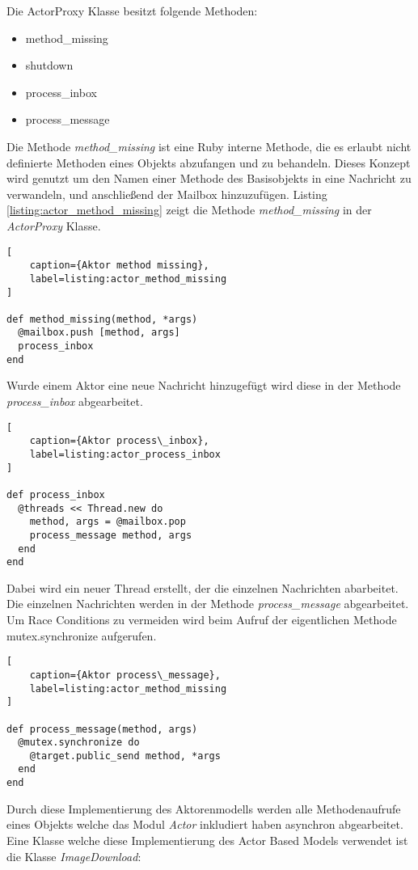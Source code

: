 Die ActorProxy Klasse besitzt folgende Methoden:

\begin{itemize}
  \item method\_missing
  \item shutdown
  \item process\_inbox
  \item process\_message
\end{itemize}

Die Methode \emph{method\_missing} ist eine Ruby interne Methode, die es erlaubt nicht definierte Methoden eines Objekts abzufangen und zu behandeln. Dieses Konzept wird genutzt um den Namen einer Methode des Basisobjekts in eine Nachricht zu verwandeln, und anschließend der Mailbox hinzuzufügen. Listing \ref{listing:actor_method_missing} zeigt die Methode \emph{method\_missing} in der \emph{ActorProxy} Klasse. 

\begin{lstlisting}[
	caption={Aktor method missing},
	label=listing:actor_method_missing
]

def method_missing(method, *args)
  @mailbox.push [method, args]
  process_inbox
end
\end{lstlisting}

Wurde einem Aktor eine neue Nachricht hinzugefügt wird diese in der Methode \emph{process\_inbox} abgearbeitet. 

\begin{lstlisting}[
	caption={Aktor process\_inbox},
	label=listing:actor_process_inbox
]

def process_inbox
  @threads << Thread.new do
    method, args = @mailbox.pop
    process_message method, args
  end
end
\end{lstlisting}	

Dabei wird ein neuer Thread erstellt, der die einzelnen Nachrichten abarbeitet. Die einzelnen Nachrichten werden in der Methode \emph{process\_message} abgearbeitet. Um Race Conditions zu vermeiden wird beim Aufruf der eigentlichen Methode mutex.synchronize aufgerufen. 


\begin{lstlisting}[
	caption={Aktor process\_message},
	label=listing:actor_method_missing
]

def process_message(method, args)
  @mutex.synchronize do
    @target.public_send method, *args
  end
end
\end{lstlisting}	

Durch diese Implementierung des Aktorenmodells werden alle Methodenaufrufe eines Objekts welche das Modul \emph{Actor} inkludiert haben asynchron abgearbeitet. Eine Klasse welche diese Implementierung des Actor Based Models verwendet ist die Klasse \emph{ImageDownload}:

